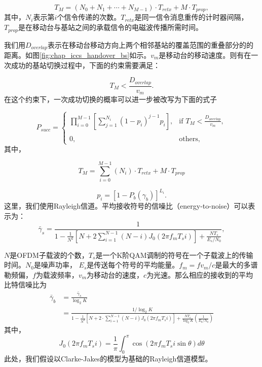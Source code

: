 $$
T_{M}=(N_{0}+N_{1}+\cdots+N_{M-1})\cdot T_{retx}+M\cdot T_{prop},
$$
其中，$N_i$表示第$i$个信令传递的次数。$T_{retx}$是同一信令消息重传的计时器间隔，$T_{prop}$是在移动台与基站之间的承载信令的电磁波传播所需时间。

我们用$D_{overlap}$表示在移动台移动方向上两个相邻基站的覆盖范围的重叠部分的的距离。如图\ref{fig:chap_iccs_handover_bs}如示。$v_m$是移动台的移动速度。则有在一次成功的基站切换过程中，下面的约束需要满足：

\begin{equation}
T_{M}<\frac{D_{overlap}}{v_{m}}.
\end{equation}
在这个约束下，一次成功切换的概率可以进一步被改写为下面的式子

\begin{equation}
P_{succ}=\left\{
\begin{array}{ll}
\prod_{i=0}^{M-1}\left[\sum_{j=1}^{N_{i}}(1-p_{i})^{j-1}p_{i}\right],
& \mbox{if }T_{M}<\frac{D_{overlap}}{v_{m}},\\
\\0, & \mbox{others},
\end{array}\right.\label{eq:chap_iccs_handover_algorithm_Pro_basic_final00}
\end{equation}
其中，

$$
T_{M}=\sum_{i=0}^{M-1}(N_{i})\cdot T_{retx}+M\cdot T_{prop}
$$

$$
p_{i}=[1-P_{b}(\gamma_{b})]^{L_{i}}.
$$
这里，我们使用Rayleigh信道。平均接收符号的信噪比（energy-to-noise）可以表示为：\cite{GLST:PMC2002}\cite{Leung:WCNC2005}
\begin{equation}
\bar{\gamma}_{s}=\frac{1}{1-\frac{1}{N^{2}}\left[N+2\sum_{i=1}^{N-1}\left(N-i\right)J_{0}(2\pi f_{m}T_{s}i) \right]
+\frac{NT_{s}}{E_s/N_{0}}},
\end{equation}

$N$是OFDM子载波的个数，$T_s$是一个K阶QAM调制的符号在一个子载波上的传输时间。$N_0$是噪声功率， $E_s$是传送每个符号的平均能量。$f_{m}=fv_{m}/c $是最大的多谱勒频偏，$f$为载波频率，$v_m$为移动台的速度，$c$为光速。那么相应的接收到的平均比特信噪比为
\begin{align}
\bar{\gamma}_{b}&= \frac{ \bar{\gamma}_s} {\log_2K} \\
&=\frac{1/\log_{2}K}{1-\frac{1}{N^{2}}\left[N+2\cdot \sum_{i=1}^{N-1}\left(N-i\right) J_{0}(2\pi f_{m}T_{s}i) \right]
+\frac{NT_{s}}{\log_{2}K}\left(\frac{1}{E_{b}/N_{0}}\right)}
\end{align}
其中，
\begin{equation*}
J_{0}(2\pi f_{m}T_{s}i) = \frac{1}{\pi}\int_0^\pi \cos(2\pi f_m T_{s}i \sin \theta) d \theta
\end{equation*}
此处，我们假设以Clarke-Jakes的模型为基础的Rayleigh信道模型。

